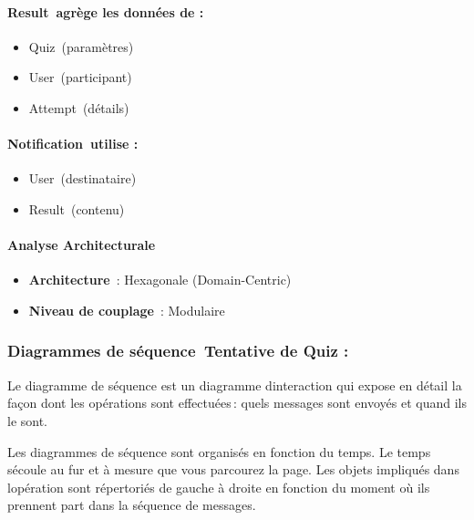 \documentclass[12pt,a4paper,twoside]{report}
\begin{document}
\hypertarget{result-agruxe8ge-les-donnuxe9es-de}{%
\paragraph{Result~agrège les données de
:}\label{result-agruxe8ge-les-donnuxe9es-de}}

\begin{itemize}
\item
  Quiz~(paramètres)
\item
  User~(participant)
\item
  Attempt~(détails)
\end{itemize}

\hypertarget{notification-utilise}{%
\paragraph{Notification~utilise :}\label{notification-utilise}}

\begin{itemize}
\item
  User~(destinataire)
\item
  Result~(contenu)
\end{itemize}

\hypertarget{analyse-architecturale}{%
\paragraph{Analyse Architecturale}\label{analyse-architecturale}}

\begin{itemize}
\item
  \textbf{Architecture}~: Hexagonale (Domain-Centric)
\item
  \textbf{Niveau de couplage}~: Modulaire
\end{itemize}

\hypertarget{diagrammes-de-suxe9quence-tentative-de-quiz}{%
\subsubsection{Diagrammes de séquence~Tentative de Quiz
:}\label{diagrammes-de-suxe9quence-tentative-de-quiz}}

Le diagramme de séquence est un diagramme d\textquotesingle interaction
qui expose en détail la façon dont les opérations sont effectuées\,:
quels messages sont envoyés et quand ils le sont.~~

Les diagrammes de séquence sont organisés en fonction du temps. Le temps
s\textquotesingle écoule au fur et à mesure que vous parcourez la page.
Les objets impliqués dans l\textquotesingle opération sont répertoriés
de gauche à droite en fonction du moment où ils prennent part dans la
séquence de messages.~
\end{document}
